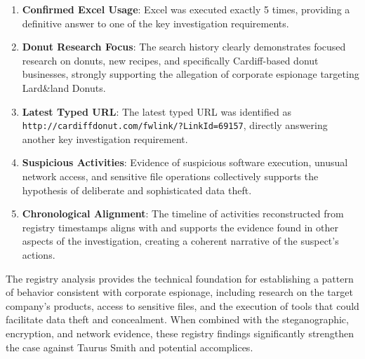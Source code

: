 \begin{enumerate}
    \item \textbf{Confirmed Excel Usage}: Excel was executed exactly 5 times, providing a definitive answer to one of the key investigation requirements.
    
    \item \textbf{Donut Research Focus}: The search history clearly demonstrates focused research on donuts, new recipes, and specifically Cardiff-based donut businesses, strongly supporting the allegation of corporate espionage targeting Lard\&land Donuts.
    
    \item \textbf{Latest Typed URL}: The latest typed URL was identified as \texttt{http://cardiffdonut.com/fwlink/?LinkId=69157}, directly answering another key investigation requirement.
    
    \item \textbf{Suspicious Activities}: Evidence of suspicious software execution, unusual network access, and sensitive file operations collectively supports the hypothesis of deliberate and sophisticated data theft.
    
    \item \textbf{Chronological Alignment}: The timeline of activities reconstructed from registry timestamps aligns with and supports the evidence found in other aspects of the investigation, creating a coherent narrative of the suspect's actions.
\end{enumerate}

The registry analysis provides the technical foundation for establishing a pattern of behavior consistent with corporate espionage, including research on the target company's products, access to sensitive files, and the execution of tools that could facilitate data theft and concealment. When combined with the steganographic, encryption, and network evidence, these registry findings significantly strengthen the case against Taurus Smith and potential accomplices.